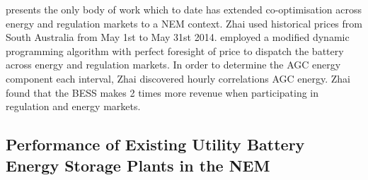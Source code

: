 \newline
\newline
\parencite{Zhai:2018} presents the only body of work which to date has extended co-optimisation across energy and regulation markets to a NEM context. Zhai used historical prices from South Australia from May 1st to May 31st 2014. \parencite{Zhai:2018} employed a modified dynamic programming algorithm with perfect foresight of price to dispatch the battery across energy and regulation markets. In order to determine the AGC energy component each interval, Zhai discovered hourly correlations AGC energy. Zhai found that the BESS makes 2 times more revenue when participating in regulation and energy markets. 

\subsection{ Performance of Existing Utility Battery Energy Storage Plants in the NEM }
